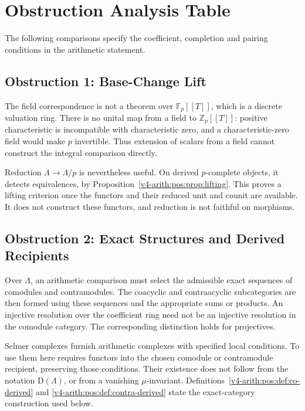 \section{Obstruction Analysis Table}
\label{v4-arith:pos:obstruction-analysis-table}

The following comparisons specify the coefficient, completion and
pairing conditions in the arithmetic statement.

\subsection{Obstruction 1: Base-Change Lift}
\label{v4-arith:pos:att-1-base-change}

The field correspondence is not a theorem over
\(\mathbb F_p[[T]]\), which is a discrete valuation ring.
There is no unital map from a field to \(\mathbb Z_p[[T]]\):
positive characteristic is incompatible with characteristic zero,
and a characteristic-zero field would make \(p\) invertible.
Thus extension of scalars from a field cannot construct the
integral comparison directly.

Reduction \(\Lambda\to\Lambda/p\) is nevertheless useful.
On derived \(p\)-complete objects, it detects equivalences,
by Proposition~\ref{v4-arith:pos:prop:lifting}.
This proves a lifting criterion once the functors and their
reduced unit and counit are available.
It does not construct these functors, and reduction is not
faithful on morphisms.

\subsection{Obstruction 2: Exact Structures and Derived Recipients}
\label{v4-arith:pos:att-2-co-contra}

Over \(\Lambda\), an arithmetic comparison must select the
admissible exact sequences of comodules and contramodules.
The coacyclic and contraacyclic subcategories are then formed
using these sequences and the appropriate sums or products.
An injective resolution over the coefficient ring need not be
an injective resolution in the comodule category.
The corresponding distinction holds for projectives.

Selmer complexes furnish arithmetic complexes with specified
local conditions. To use them here requires functors into the
chosen comodule or contramodule recipient, preserving those
conditions. Their existence does not follow from the notation
\(\mathrm D(\Lambda)\), or from a vanishing \(\mu\)-invariant.
Definitions~\ref{v4-arith:pos:def:co-derived} and
\ref{v4-arith:pos:def:contra-derived} state the exact-category
construction used below.

